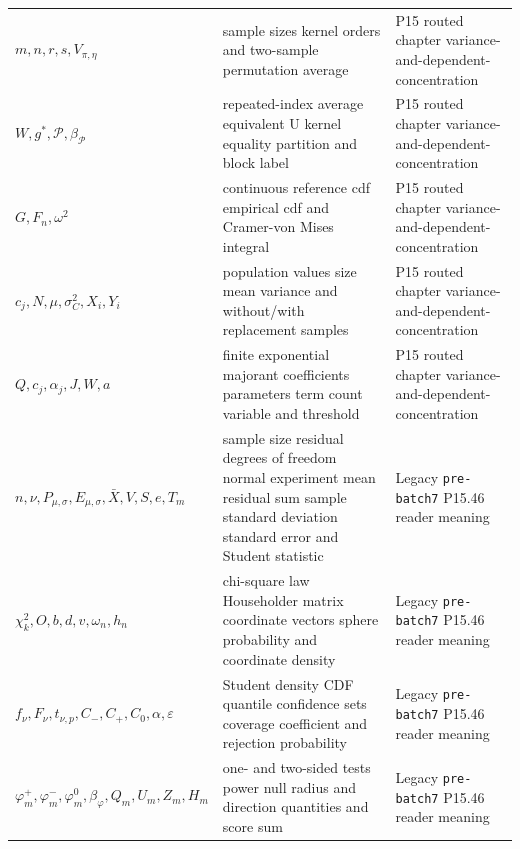 \begin{longtable}{@{}p{}p{}p{}@{}}
\(m,\allowbreak n,\allowbreak r,\allowbreak s,\allowbreak V_{\pi,\eta}\) & sample sizes kernel orders and two-sample permutation average & P15 routed chapter variance-\allowbreak{}and-\allowbreak{}dependent-\allowbreak{}concentration \\
\(W,\allowbreak g^*,\allowbreak \mathcal P,\allowbreak \beta_{\mathcal P}\) & repeated-index average equivalent U kernel equality partition and block label & P15 routed chapter variance-\allowbreak{}and-\allowbreak{}dependent-\allowbreak{}concentration \\
\(G,\allowbreak F_n,\allowbreak \omega^2\) & continuous reference cdf empirical cdf and Cramer-von Mises integral & P15 routed chapter variance-\allowbreak{}and-\allowbreak{}dependent-\allowbreak{}concentration \\
\(c_j,\allowbreak N,\allowbreak \mu,\allowbreak \sigma_C^2,\allowbreak X_i,\allowbreak Y_i\) & population values size mean variance and without/with replacement samples & P15 routed chapter variance-\allowbreak{}and-\allowbreak{}dependent-\allowbreak{}concentration \\
\(Q,\allowbreak c_j,\allowbreak \alpha_j,\allowbreak J,\allowbreak W,\allowbreak a\) & finite exponential majorant coefficients parameters term count variable and threshold & P15 routed chapter variance-\allowbreak{}and-\allowbreak{}dependent-\allowbreak{}concentration \\
\(n,\allowbreak \nu,\allowbreak P_{\mu,\sigma},\allowbreak E_{\mu,\sigma},\allowbreak \bar X,\allowbreak V,\allowbreak S,\allowbreak e,\allowbreak T_m\) & sample size residual degrees of freedom normal experiment mean residual sum sample standard deviation standard error and Student statistic & Legacy \texttt{pre-\allowbreak{}batch7} P15.\allowbreak{}46 reader meaning \\
\(\chi_k^2,\allowbreak O,\allowbreak b,\allowbreak d,\allowbreak v,\allowbreak \omega_n,\allowbreak h_n\) & chi-square law Householder matrix coordinate vectors sphere probability and coordinate density & Legacy \texttt{pre-\allowbreak{}batch7} P15.\allowbreak{}46 reader meaning \\
\(f_\nu,\allowbreak F_\nu,\allowbreak t_{\nu,p},\allowbreak C_-,\allowbreak C_+,\allowbreak C_0,\allowbreak \alpha,\allowbreak \varepsilon\) & Student density CDF quantile confidence sets coverage coefficient and rejection probability & Legacy \texttt{pre-\allowbreak{}batch7} P15.\allowbreak{}46 reader meaning \\
\(\varphi_m^+,\allowbreak \varphi_m^-,\allowbreak \varphi_m^0,\allowbreak \beta_\varphi,\allowbreak Q_m,\allowbreak U_m,\allowbreak Z_m,\allowbreak H_m\) & one- and two-sided tests power null radius and direction quantities and score sum & Legacy \texttt{pre-\allowbreak{}batch7} P15.\allowbreak{}46 reader meaning \\

\end{longtable}
